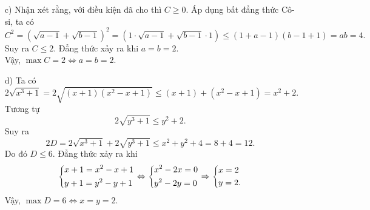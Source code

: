 \begin{bt}
{\begin{enumerate}
\begin{note}
    	Bất đẳng thức $(1)$ có thể được chứng minh bằng bất đẳng thức Bu-nhi-a-cốp-xki với hai dãy số $a,b,c$ và $1,1,1$. 
    	$$(a+b+c)^2=(1\cdot a+1\cdot b+1\cdot c)^2 \leq 3(a^2+b^2+c^2).$$
    \end{note}
    \item[c)] Nhận xét rằng, với điều kiện đã cho thì $C\geq 0$. Áp dụng bất đẳng thức Cô-si, ta có
    $$C^2=\left(\sqrt{a-1}+\sqrt{b-1}\right)^2=\left(1\cdot \sqrt{a-1}+\sqrt{b-1}\cdot 1\right)\leq (1+a-1)(b-1+1)=ab=4.$$
    Suy ra $C\leq 2$. Đẳng thức xảy ra khi $a=b=2$.\\
    Vậy, $\max C=2\Leftrightarrow a=b=2.$
    \item[d)] Ta có
    $$2\sqrt{x^3+1}=2\sqrt{(x+1)(x^2-x+1)}\leq (x+1)+(x^2-x+1)=x^2+2.$$
    Tương tự $$2\sqrt{y^3+1}\leq y^2+2.$$
    Suy ra $$2D=2\sqrt{x^3+1}+2\sqrt{y^3+1}\leq x^2+y^2+4=8+4=12.$$
    Do đó $D\leq 6$. Đẳng thức xảy ra khi
    $$\left\{\begin{aligned}& x+1=x^2-x+1\\ & y+1=y^2-y+1\end{aligned}\right.\Leftrightarrow \left\{\begin{aligned}& x^2-2x=0\\ & y^2-2y=0\end{aligned}\right. \Rightarrow \left\{\begin{aligned}& x=2 \\ & y=2.\end{aligned}\right.$$
    Vậy, $\max D=6\Leftrightarrow x=y=2$.
    \end{enumerate}            
    }
\end{bt}


